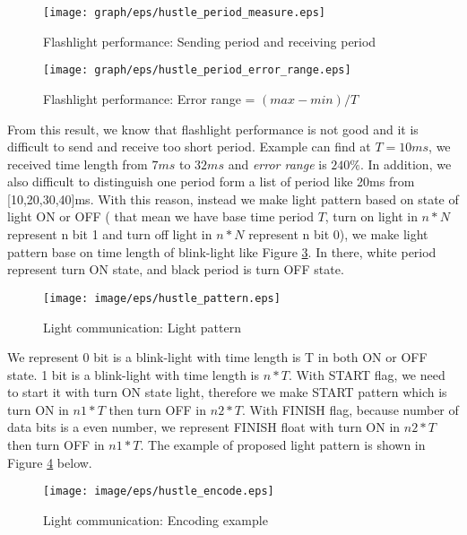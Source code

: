 \begin{figure}[tb]
\centering
\texttt{[image: graph/eps/hustle\_period\_measure.eps]}
\caption{Flashlight performance: Sending period and receiving period}
\label{fig:hustle_period_measure}
\end{figure}

\begin{figure}[tb]
\centering
\texttt{[image: graph/eps/hustle\_period\_error\_range.eps]}
\caption{Flashlight performance: Error range = $(max-min)/T$}
\label{fig:hustle_period_error_range}
\end{figure}


From this result, we know that flashlight performance is not good and it is difficult to send and receive too short period. Example can find at $T = 10ms$, we received time length from $7ms$ to $32ms$ and \emph{error range} is $240\%$. In addition, we also difficult to distinguish one period form a list of period like 20ms from [10,20,30,40]ms. With this reason, instead we make light pattern based on state of light ON or OFF ( that mean we have base time period $T$, turn on light in $n*N$ represent n bit 1 and turn off light in $n*N$ represent n bit 0), we make light pattern base on time length of blink-light like Figure \ref{fig:hustle_light_pattern}. In there, white period represent turn ON state, and black period is turn OFF state.

\begin{figure}[tb]
\centering
\texttt{[image: image/eps/hustle\_pattern.eps]}
\caption{Light communication: Light pattern}
\label{fig:hustle_light_pattern}
\end{figure}

We represent 0 bit is a blink-light with time length is T in both ON or OFF state. 1 bit is a blink-light with time length is $n*T$. With START flag, we need to start it with turn ON state light, therefore we make START pattern which is turn ON in $n1*T$ then turn OFF in $n2*T$. With FINISH flag, because number of data bits is a even number, we represent FINISH float with turn ON in $n2*T$ then turn OFF in $n1*T$. The example of proposed light pattern is shown in Figure \ref{fig:hustle_light_pattern_example} below.

\begin{figure}[tb]
\centering
\texttt{[image: image/eps/hustle\_encode.eps]}
\caption{Light communication: Encoding example}
\label{fig:hustle_light_pattern_example}
\end{figure}

